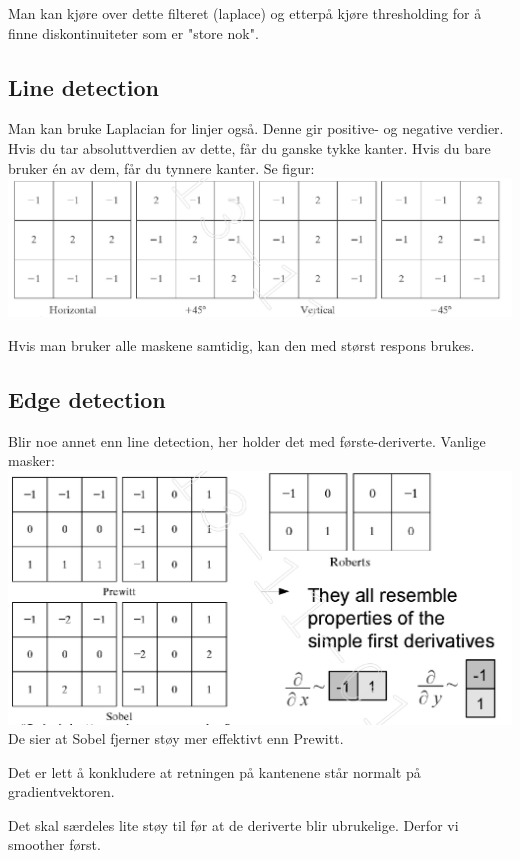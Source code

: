 Man kan kjøre over dette filteret (laplace) og etterpå kjøre thresholding for å finne diskontinuiteter som er "store nok".

\subsection{Line detection}
Man kan bruke Laplacian for linjer også. Denne gir positive- og negative verdier. Hvis du tar absoluttverdien av dette, får du ganske tykke kanter. Hvis du bare bruker én av dem, får du tynnere kanter.
Se figur:
\\ \includegraphics[width=\textwidth]{Bilder/line_detection.png}

Hvis man bruker alle maskene samtidig, kan den med størst respons brukes.

\subsection{Edge detection}
Blir noe annet enn line detection, her holder det med første-deriverte. Vanlige masker:
\\ \includegraphics[width=\textwidth]{Bilder/edge_detection.png}
De sier at Sobel fjerner støy mer effektivt enn Prewitt.

Det er lett å konkludere at retningen på kantenene står normalt på gradientvektoren.

Det skal særdeles lite støy til før at de deriverte blir ubrukelige. Derfor vi smoother først.



